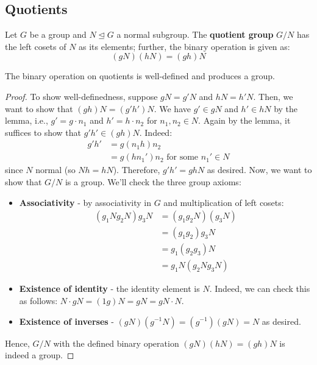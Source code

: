\documentclass{article}
\theoremstyle{plain}
\begin{document}
\subsection{Quotients}
\begin{definition}{}{}
Let $G$ be a group and $N \trianglelefteq G$ a normal subgroup. The \textbf{quotient group} $G/N$ has the left cosets of $N$ as its elements; further, the binary operation is given as: $$(gN)(hN) = (gh)N$$
\end{definition}
\begin{theorem}{}{}
The binary operation on quotients is well-defined and produces a group.
\end{theorem}
\begin{proof}
To show well-definedness, suppose $gN = g'N$ and $hN = h'N$. Then, we want to show that $(gh)N = (g'h')N$. We have $g' \in gN$ and $h' \in hN$ by the lemma, i.e., $g' = g\cdot n_1$ and $h' = h\cdot n_2$ for $n_1,n_2 \in N$. Again by the lemma, it suffices to show that $g'h' \in (gh)N$. Indeed:
\begin{align*}
g'h' &= g(n_1h)n_2 \\
&=g(hn_1')n_2 \text{ for some $n_1' \in N$}
\end{align*}
since $N$ normal (so $Nh = hN$). Therefore, $g'h' = ghN$ as desired. Now, we want to show that $G/N$ is a group. We'll check the three group axioms:
\begin{itemize}
\item \textbf{Associativity} - by associativity in $G$ and multiplication of left cosets:
\begin{align*}
(g_1Ng_2N)g_3N &= (g_1g_2N)(g_3N) \\
			    &= (g_1g_2)g_3N \\
			    &= g_1(g_2g_3)N \\
			    &= g_1N(g_2Ng_3N)
\end{align*}
\item \textbf{Existence of identity} - the identity element is $N$. Indeed, we can check this as follows: $N \cdot gN = (1g)N = gN = gN\cdot N$.
\item \textbf{Existence of inverses} - $(gN)(g^{-1}N) = (g^{-1})(gN) = N$ as desired.
\end{itemize}
Hence, $G/N$ with the defined binary operation $(gN)(hN) = (gh)N$ is indeed a group.
\end{proof}
\vspace{0.5cm}
\end{document}
